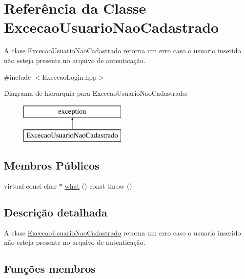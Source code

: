\hypertarget{class_excecao_usuario_nao_cadastrado}{}\section{Referência da Classe Excecao\+Usuario\+Nao\+Cadastrado}
\label{class_excecao_usuario_nao_cadastrado}


A clase \mbox{\hyperlink{class_excecao_usuario_nao_cadastrado}{Excecao\+Usuario\+Nao\+Cadastrado}} retorna um erro caso o usuario inserido não esteja presente no arquivo de autenticação.  




{\ttfamily \#include $<$Excecao\+Login.\+hpp$>$}

Diagrama de hierarquia para Excecao\+Usuario\+Nao\+Cadastrado\+:\begin{figure}[H]
\begin{center}
\leavevmode
\includegraphics[height=2.000000cm]{class_excecao_usuario_nao_cadastrado}
\end{center}
\end{figure}
\subsection*{Membros Públicos}
\begin{DoxyCompactItemize}
\item 
virtual const char $\ast$ \mbox{\hyperlink{class_excecao_usuario_nao_cadastrado_a82a80231cd1940f229231d872ba0379a}{what}} () const  throw ()
\end{DoxyCompactItemize}


\subsection{Descrição detalhada}
A clase \mbox{\hyperlink{class_excecao_usuario_nao_cadastrado}{Excecao\+Usuario\+Nao\+Cadastrado}} retorna um erro caso o usuario inserido não esteja presente no arquivo de autenticação. 

\subsection{Funções membros}
\mbox{\label{class_excecao_usuario_nao_cadastrado_a82a80231cd1940f229231d872ba0379a}} 

